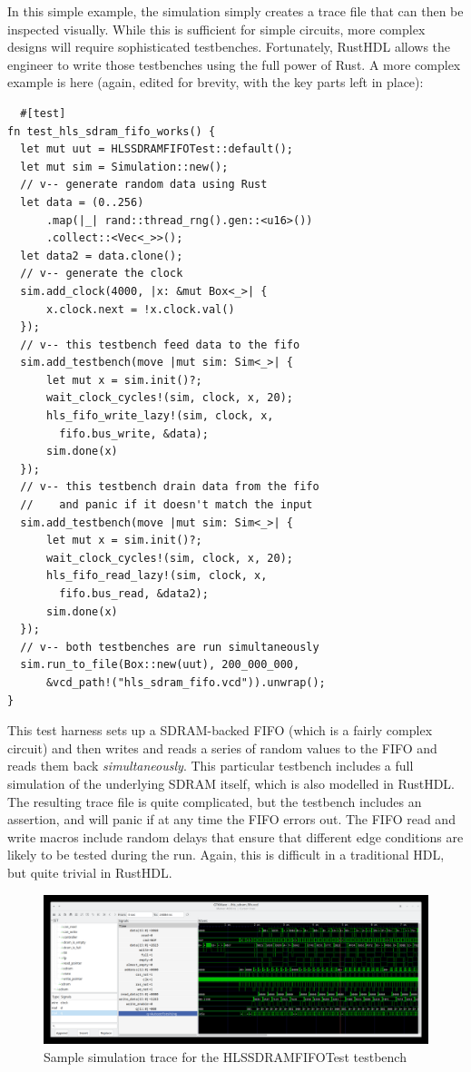 \documentclass[conference]{IEEEtran}
\begin{document}
In this simple example, the simulation simply creates a trace file that can then be inspected visually.  While this 
is sufficient for simple circuits, more complex designs will require sophisticated testbenches.  Fortunately, RustHDL
allows the engineer to write those testbenches using the full power of Rust.  A more complex example is here (again, edited for
brevity, with the key parts left in place):

\begin{verbatim}
  #[test]
fn test_hls_sdram_fifo_works() {
  let mut uut = HLSSDRAMFIFOTest::default();
  let mut sim = Simulation::new();
  // v-- generate random data using Rust
  let data = (0..256)
      .map(|_| rand::thread_rng().gen::<u16>())
      .collect::<Vec<_>>();
  let data2 = data.clone();
  // v-- generate the clock
  sim.add_clock(4000, |x: &mut Box<_>| {
      x.clock.next = !x.clock.val()
  });
  // v-- this testbench feed data to the fifo
  sim.add_testbench(move |mut sim: Sim<_>| {
      let mut x = sim.init()?;
      wait_clock_cycles!(sim, clock, x, 20);
      hls_fifo_write_lazy!(sim, clock, x, 
        fifo.bus_write, &data);
      sim.done(x)
  });
  // v-- this testbench drain data from the fifo
  //    and panic if it doesn't match the input
  sim.add_testbench(move |mut sim: Sim<_>| {
      let mut x = sim.init()?;
      wait_clock_cycles!(sim, clock, x, 20);
      hls_fifo_read_lazy!(sim, clock, x, 
        fifo.bus_read, &data2);
      sim.done(x)
  });
  // v-- both testbenches are run simultaneously
  sim.run_to_file(Box::new(uut), 200_000_000, 
      &vcd_path!("hls_sdram_fifo.vcd")).unwrap();
}
\end{verbatim}

This test harness sets up a SDRAM-backed FIFO (which is a fairly complex circuit) and then writes and reads a 
series of random values to the FIFO and reads them back \emph{simultaneously}.  This particular testbench includes
a full simulation of the underlying SDRAM itself, which is also modelled in RustHDL.  The resulting trace file is
quite complicated, but the testbench includes an assertion, and will panic if at any time the FIFO errors out.  The 
FIFO read and write macros include random delays that ensure that different edge conditions are likely to be tested 
during the run.  Again, this is difficult in a traditional HDL, but quite trivial in RustHDL.

\begin{figure}[htbp]
  \centerline{\includegraphics[width=18cm]{hls_sdram_fifo.png}}
  \caption{Sample simulation trace for the \textrm{HLSSDRAMFIFOTest} testbench}
  \label{fig}
\end{figure}
  
\end{document}
